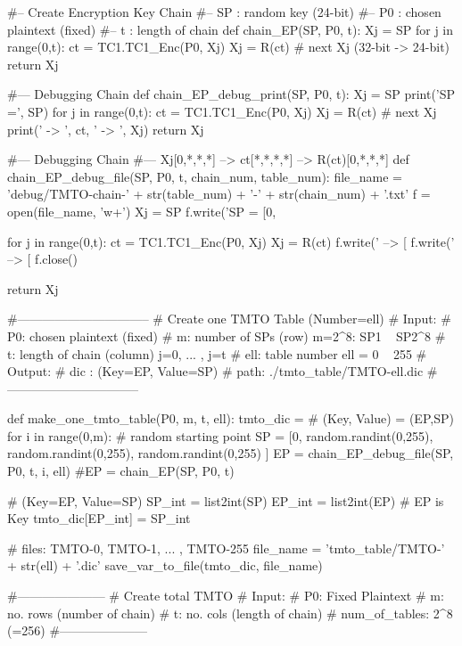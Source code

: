 \begin{python}
#-- Create Encryption Key Chain
#-- SP : random key (24-bit)
#-- P0 : chosen plaintext (fixed)
#-- t  : length of chain
def chain_EP(SP, P0, t):
   Xj = SP
   for j in range(0,t):
      ct = TC1.TC1_Enc(P0, Xj)
      Xj = R(ct)   # next Xj (32-bit -> 24-bit)
   return Xj

#--- Debugging Chain
def chain_EP_debug_print(SP, P0, t):
   Xj = SP
   print('SP =', SP)
   for j in range(0,t):
      ct = TC1.TC1_Enc(P0, Xj)
      Xj = R(ct)   # next Xj 
      print(' -> ', ct, ' -> ', Xj)
   return Xj

#--- Debugging Chain
#--- Xj[0,*,*,*] --> ct[*,*,*,*] --> R(ct)[0,*,*,*]
def chain_EP_debug_file(SP, P0, t, chain_num, table_num):
   file_name = 'debug/TMTO-chain-' + str(table_num) + '-' + str(chain_num) + '.txt'
   f = open(file_name, 'w+')
   Xj = SP
   f.write('SP = [0, %

   for j in range(0,t):
      ct = TC1.TC1_Enc(P0, Xj)
      Xj = R(ct)
      f.write(' --> [%
      f.write(' --> [%
   f.close()

   return Xj

#--------------------------------
# Create one TMTO Table (Number=ell)
# Input:
#      P0: chosen plaintext (fixed)
#       m: number of SPs (row)        m=2^8: SP1 ~ SP2^8
#       t: length of chain (column)   j=0, ... , j=t
#     ell: table number               ell = 0 ~ 255
# Output: 
#    dic : { (Key=EP, Value=SP) }    
#    path: ./tmto_table/TMTO-ell.dic
#--------------------------------

def make_one_tmto_table(P0, m, t, ell):
   tmto_dic = {}  # (Key, Value) = (EP,SP)
   for i in range(0,m):
      # random starting point
      SP = [0, random.randint(0,255), random.randint(0,255), random.randint(0,255) ]
      EP = chain_EP_debug_file(SP, P0, t, i, ell)
      #EP = chain_EP(SP, P0, t)  

      # { (Key=EP, Value=SP) }
      SP_int = list2int(SP)
      EP_int = list2int(EP)
      # EP is Key
      tmto_dic[EP_int] = SP_int

   # files: TMTO-0, TMTO-1, ... , TMTO-255
   file_name = 'tmto_table/TMTO-' + str(ell) + '.dic'
   save_var_to_file(tmto_dic, file_name)

#---------------------
# Create total TMTO
# Input:
#   P0: Fixed Plaintext 
#   m: no. rows (number of chain)
#   t: no. cols (length of chain)
#   num_of_tables: 2^8 (=256)
#---------------------
   

\end{python}
